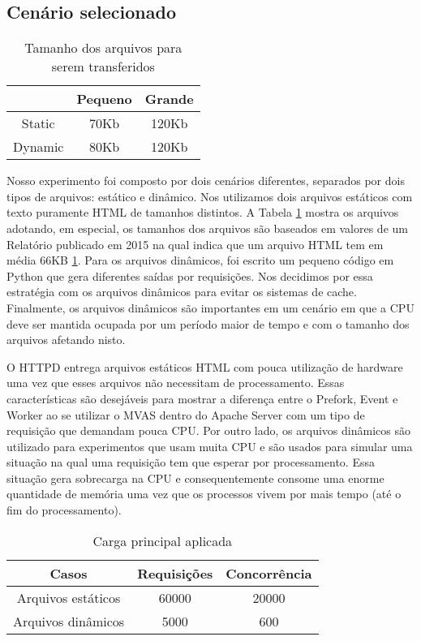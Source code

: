 \subsection{Cenário selecionado} \label{sec:scenarios}

\begin{table}[!h] \centering \begin{tabular}{|c|c|c|} \hline & \textbf{Pequeno}
& \textbf{Grande}\\ \hline Static & 70Kb & 120Kb\\ \hline Dynamic & 80Kb &
120Kb \\ \hline \end{tabular} \caption{Tamanho dos arquivos para serem
transferidos} \label{tab:file_size} \end{table}

Nosso experimento foi composto por dois cenários diferentes, separados por dois
tipos de arquivos: estático e dinâmico. Nos utilizamos dois arquivos estáticos
com texto puramente HTML de tamanhos distintos. A Tabela \ref{tab:file_size}
mostra os arquivos adotando, em especial, os tamanhos dos arquivos são baseados
em valores de um Relatório publicado em 2015 na qual indica que um arquivo HTML
tem em média 66KB \ref{tab:file_size}. Para os arquivos dinâmicos, foi escrito
um pequeno código em Python que gera diferentes saídas por requisições. Nos
decidimos por essa estratégia com os arquivos dinâmicos para evitar os sistemas
de cache. Finalmente, os arquivos dinâmicos são importantes em um cenário em
que a CPU deve ser mantida ocupada por um período maior de tempo e com o
tamanho dos arquivos afetando nisto.

O HTTPD entrega arquivos estáticos HTML com pouca utilização de hardware uma
vez que esses arquivos não necessitam de processamento. Essas características
são desejáveis para mostrar a diferença entre o Prefork, Event e Worker ao se
utilizar o MVAS dentro do Apache Server com um tipo de requisição que demandam
pouca CPU. Por outro lado, os arquivos dinâmicos são utilizado para
experimentos que usam muita CPU e são usados para simular uma situação na qual
uma requisição tem que esperar por processamento. Essa situação gera sobrecarga
na CPU e consequentemente consome uma enorme quantidade de memória uma vez que
os processos vivem por mais tempo (até o fim do processamento).

\begin{table}[h!] \centering \begin{tabular}{|c|c|c|} \hline Casos &
\textbf{Requisições} & \textbf{Concorrência}\\ \hline Arquivos estáticos &
60000 & 20000\\ \hline Arquivos dinâmicos & 5000 & 600 \\ \hline \end{tabular}
\caption{Carga principal aplicada} \label{tab:loads} \end{table}

